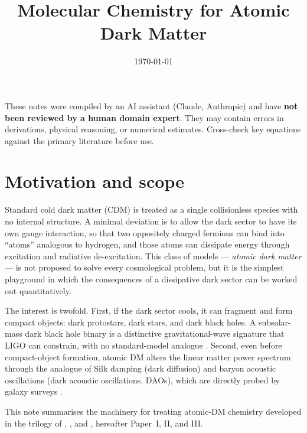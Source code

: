 \documentclass[12pt]{article}
\title{Molecular Chemistry for Atomic Dark Matter}
\author{}
\date{\today}
\begin{document}
\maketitle
\tableofcontents
\newpage

\begin{tcolorbox}[colback=yellow!10!white, colframe=orange!75!black,
                  title={\bfseries Disclaimer}]
These notes were compiled by an AI assistant (Claude, Anthropic) and have
\textbf{not been reviewed by a human domain expert}.  They may contain
errors in derivations, physical reasoning, or numerical estimates.
Cross-check key equations against the primary literature before use.
\end{tcolorbox}
\vspace{0.5em}

\section{Motivation and scope}
\label{sec:motivation}

Standard cold dark matter (CDM) is treated as a single collisionless
species with no internal structure.  A minimal deviation is to allow
the dark sector to have its own gauge interaction, so that two
oppositely charged fermions can bind into ``atoms'' analogous to
hydrogen, and those atoms can dissipate energy through excitation and
radiative de-excitation.  This class of models --- \emph{atomic dark
matter} \citep{GoldbergHall1986, Ackerman2009, Kaplan2010,
CyrRacineSigurdson2013, Fan2013} --- is not proposed to solve every
cosmological problem, but it is the simplest playground in which the
consequences of a dissipative dark sector can be worked out
quantitatively.

The interest is twofold.  First, if the dark sector cools, it can
fragment and form compact objects: dark protostars, dark stars, and
dark black holes.  A subsolar-mass dark black hole binary is a
distinctive gravitational-wave signature that LIGO can constrain, with
no standard-model analogue \citep{Shandera2018, Singh2020}.  Second,
even before compact-object formation, atomic DM alters the linear
matter power spectrum through the analogue of Silk damping (dark
diffusion) and baryon acoustic oscillations (dark acoustic
oscillations, DAOs), which are directly probed by galaxy surveys
\citep{CyrRacineSigurdson2013}.

This note summarises the machinery for treating atomic-DM chemistry
developed in the trilogy of \citet{Ryan2022a}, \citet{Gurian2022}, and
\citet{Ryan2022b}, hereafter Paper~I, II, and III.
\end{document}
